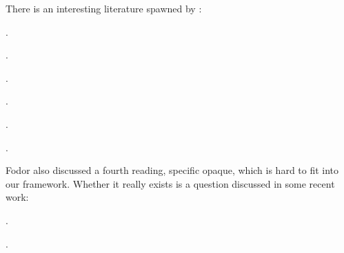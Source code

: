 {\setlength{\parindent}{0pt}\setlength{\parskip}{6pt}

There is an interesting literature spawned by \cite{percus-2000-constraints}:
  
\begin{bibentrylist}
\item {}.
\item {}.
\item {}.
\item {}.
\item {}.
\item {}.
\end{bibentrylist}

Fodor also discussed a fourth reading, specific opaque, which is hard to fit
into our framework. Whether it really exists is a question discussed in some
recent work:

\begin{bibentrylist}
\item {}.
\item {}.
\end{bibentrylist}

}

